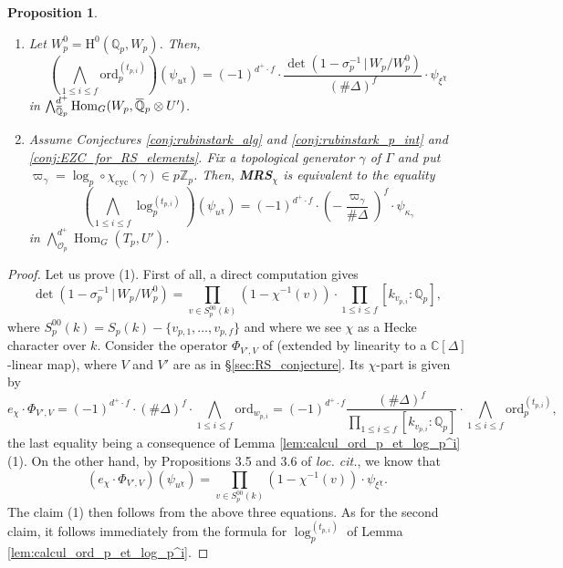 \documentclass[12pt]{amsart}
\newcommand\bC{\mathbb{C}}
\newcommand\bQ{\mathbb{Q}}
\newcommand\Zp{{\mathbb{Z}_p}}
\newcommand\Qp{{\mathbb{Q}_p}}
\newcommand\cO{\mathcal{O}}
\newcommand{\ob}[1]{\mkern 1.5mu\overline{\mkern-1.5mu#1\mkern-1.5mu}\mkern 1.5mu}
\newcommand{\ord}{\mathrm{ord}}
\DeclareMathOperator{\Hom}{Hom}
\DeclareMathOperator{\cyc}{cyc}
\newcommand{\HH}{\mathrm{H}}
\theoremstyle{defstyle}
\theoremstyle{thmstyle}
\newtheorem{proposition}[subsubsection]{Proposition}
\begin{document}
\begin{proposition}\label{prop:equivalence_MRS}\hspace{2em}
    \begin{enumerate}
    	\item Let $W_p^0=\HH^0(\Qp,W_p)$. Then, 
    	$$\left(\bigwedge_{1\leq i \leq f} \ord_p^{(t_{p,i})}\right)(\psi_{u^\chi}) = (-1)^{d^+\cdot f}\cdot \frac{\det(1-\sigma_p^{-1}\,\big| \, W_p/W_p^0)}{(\#\Delta)^f} \cdot \psi_{\xi^\chi}$$ 
    	in $\bigwedge^{d^+}_{\ob{\bQ}_p}  \Hom_G(W_p,\ob{\bQ}_p\otimes U')$.
    	\item Assume Conjectures \ref{conj:rubinstark_alg} and \ref{conj:rubinstark_p_int} and \ref{conj:EZC_for_RS_elements}. Fix a topological generator $\gamma$ of $\Gamma$ and put $\varpi_\gamma=\log_p\circ\chi_{\cyc}(\gamma)\in p\Zp$. Then, \textbf{MRS}$_\chi$ is equivalent to the equality 
    	$$\left(\bigwedge_{1\leq i \leq f} \log_p^{(t_{p,i})}\right)(\psi_{u^\chi}) = (-1)^{d^+\cdot f}\cdot \left(-\frac{\varpi_\gamma}{\#\Delta}\right)^f \cdot \psi_{\kappa_\gamma}$$
    	in ${\bigwedge}^{d^+}_{\cO_p} \Hom_G(T_p,U')$.
    \end{enumerate}
\end{proposition}
\begin{proof}
	Let us prove (1). First of all, a direct computation gives $$\det(1-\sigma_p^{-1}\,\big| \, W_p/W_p^0)=\prod_{v\in S^{00}_p(k)} (1-\chi^{-1}(v)) \cdot\prod_{1\leq i \leq f} [k_{v_{p,i}}:\Qp],$$
	where $S^{00}_p(k)=S_p(k)-\{v_{p,1},\ldots,v_{p,f}\}$ and where we see $\chi$ as a Hecke character over $k$. Consider the operator $\Phi_{V',V}$ of \cite[Prop. 3.6]{sanocompositio} (extended by linearity to a $\bC[\Delta]$-linear map), where $V$ and $V'$ are as in \S\ref{sec:RS_conjecture}. Its $\chi$-part is given by
	$$e_\chi\cdot \Phi_{V',V} = (-1)^{d^+\cdot f} \cdot{(\#\Delta)^f} \cdot \bigwedge_{1 \leq i \leq f}\ord_{w_{p,i}}= (-1)^{d^+\cdot f} \frac{(\#\Delta)^f}{\prod_{1\leq i \leq f} [k_{v_{p,i}}:\Qp]} \cdot \bigwedge_{1 \leq i \leq f}\ord_p^{(t_{p,i})},$$
	the last equality being a consequence of Lemma \ref{lem:calcul_ord_p_et_log_p^i} (1). On the other hand, by Propositions 3.5 and 3.6 of \textit{loc. cit.}, we know that
	$$\left(e_\chi \cdot \Phi_{V',V}\right)(\psi_{u^\chi}) = \prod_{v\in S_p^{00}(k)}(1-\chi^{-1}(v))\cdot \psi_{\xi^\chi}.$$
	The claim (1) then follows from the above three equations. As for the second claim, it follows immediately from the formula for $\log_p^{(t_{p,i})}$ of Lemma \ref{lem:calcul_ord_p_et_log_p^i}.
\end{proof}
\end{document}
